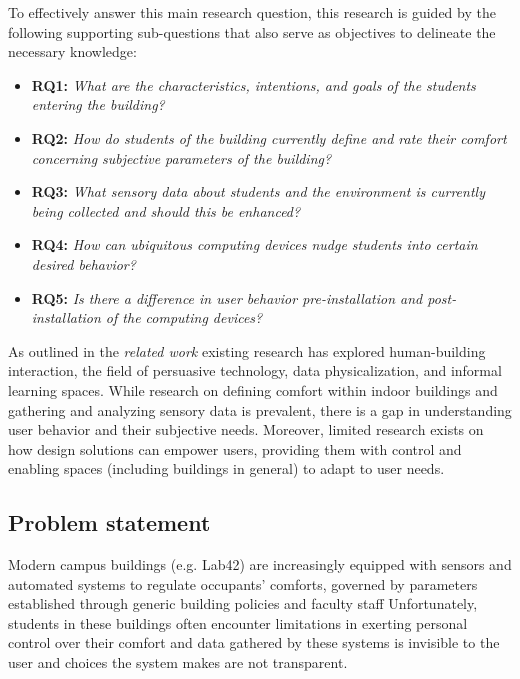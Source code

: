 To effectively answer this main research question, this research is guided by the following supporting sub-questions that also serve as objectives to delineate the necessary knowledge: \\

\begin{itemize}
    \item \textbf{RQ1:} \emph{What are the characteristics, intentions, and goals of the students entering the building? }
    \item \textbf{RQ2:} \emph{How do students of the building currently define and rate their comfort concerning subjective parameters of the building? }
    \item \textbf{RQ3:} \emph{What sensory data about students and the environment is currently being collected and should this be enhanced? }
    \item \textbf{RQ4:} \emph{How can ubiquitous computing devices nudge students into certain desired behavior? }
    \item \textbf{RQ5:} \emph{Is there a difference in user behavior pre-installation and post-installation of the computing devices? }\\
\end{itemize}

As outlined in the \emph{related work} existing research has explored human-building interaction, the field of persuasive technology, data physicalization, and informal learning spaces. While research on defining comfort within indoor buildings and gathering and analyzing sensory data is prevalent, there is a gap in understanding user behavior and their subjective needs. Moreover, limited research exists on how design solutions can empower users, providing them with control and enabling spaces (including buildings in general) to adapt to user needs.

\subsection{Problem statement}

Modern campus buildings (e.g. Lab42) are increasingly equipped with sensors and automated systems to regulate occupants' comforts, governed by parameters established through generic building policies and faculty staff Unfortunately, students in these buildings often encounter limitations in exerting personal control over their comfort and data gathered by these systems is invisible to the user and choices the system makes are not transparent.

